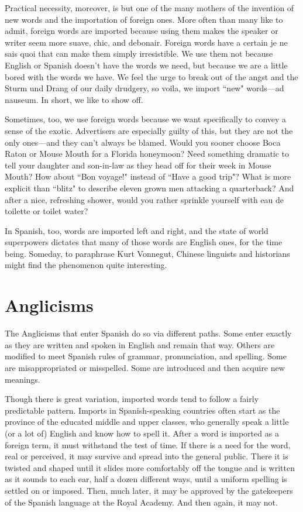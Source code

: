 Practical necessity, moreover, is but one of the many mothers
of the invention of new words and the importation of foreign ones.
More often than many like to admit, foreign words are imported because using them makes the speaker or writer seem more suave, chic,
and debonair. Foreign words have a certain je ne sais quoi that can
make them simply irresistible. We use them not because English or
Spanish doesn't have the words we need, but because we are a little
bored with the words we have. We feel the urge to break out of the
angst and the Sturm und Drang of our daily drudgery, so voila, we import ``new" words---ad nauseum. In short, we like to show off.

Sometimes, too, we use foreign words because we want specifically to convey a sense of the exotic. Advertisers are especially
guilty of this, but they are not the only ones---and they can't always
be blamed. Would you sooner choose Boca Raton or Mouse Mouth for
a Florida honeymoon? Need something dramatic to tell your daughter
and son-in-law as they head off for their week in Mouse Mouth? How
about ``Bon voyage!" instead of ``Have a good trip"? What is more explicit than ``blitz" to describe eleven grown men attacking a quarterback? And after a nice, refreshing shower, would you rather sprinkle
yourself with eau de toilette or toilet water?

In Spanish, too, words are imported left and right, and the
state of world superpowers dictates that many of those words are English ones, for the time being. Someday, to paraphrase Kurt Vonnegut,
Chinese linguists and historians might find the phenomenon quite
interesting.

\section{Anglicisms}

The Anglicisms that enter Spanish do so via different paths.
Some enter exactly as they are written and spoken in English and remain that way. Others are modified to meet Spanish rules of grammar,
pronunciation, and spelling. Some are misappropriated or misspelled.
Some are introduced and then acquire new meanings.

Though there is great variation, imported words tend to follow
a fairly predictable pattern. Imports in Spanish-speaking countries often start as the province of the educated middle and upper classes, who
generally speak a little (or a lot of) English and know how to spell it.
After a word is imported as a foreign term, it must withstand the test
of time. If there is a need for the word, real or perceived, it may survive
and spread into the general public. There it is twisted and shaped until
it slides more comfortably off the tongue and is written as it sounds to
each ear, half a dozen different ways, until a uniform spelling is settled
on or imposed. Then, much later, it may be approved by the gatekeepers of the Spanish language at the Royal Academy. And then again, it
may not.

